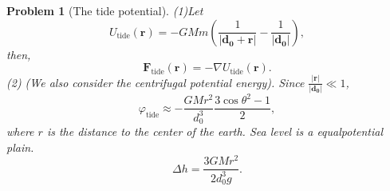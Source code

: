 \documentclass{article}
\theoremstyle{1}
\newtheorem{problem}{Problem}
\begin{document}
\begin{problem}[The tide potential]
    (1)Let 
    \begin{equation}
        U_\mathrm{tide}(\mathbf{r})=-GMm\left(\frac{1}{\left|\mathbf{d_0+r}\right|}-\frac{1}{\left|\mathbf{d_0}\right|}\right),
    \end{equation}
    then, 
    \begin{equation}
        \mathbf{F}_\mathrm{tide}(\mathbf{r})=-\nabla U_\mathrm{tide}(\mathbf{r}).
    \end{equation}
    (2)  (We also consider the centrifugal potential energy). Since $\frac{\left|\mathbf{r}\right|}{\left|\mathbf{d_0}\right|} \ll1$,
    \begin{equation}
        \varphi_\text{tide}\approx -\frac{GMr^2}{d_0^3}\frac{3 \cos \theta^2-1}{2},
    \end{equation}
    where $r$ is the distance to the center of the earth. Sea level is a  equalpotential plain. 
    \begin{equation}
        \Delta h=\frac{3GMr^2}{2d_0^3g}.
    \end{equation}

\end{problem}
\end{document}
